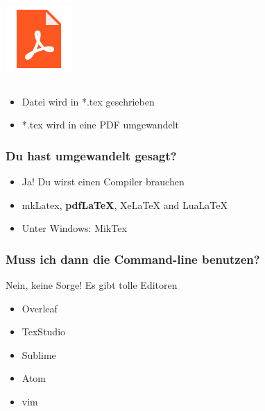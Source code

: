 \documentclass{beamer}
\begin{document}
\begin{frame}
\begin{columns}[c]
     \includegraphics[width=\textwidth]{pictures/pdficon.png}
          
     \end{columns}
\begin{itemize}[<+->]
     \item Datei wird in *.tex geschrieben
     \item *.tex wird in eine PDF umgewandelt
\end{itemize}
\end{frame}

\begin{frame}
     \frametitle{Du hast umgewandelt gesagt?}
     \begin{itemize}[<+->]
          \item Ja! Du wirst einen Compiler brauchen
               \item mkLatex, \textbf{pdfLaTeX}, XeLaTeX and LuaLaTeX
               \item Unter Windows: MikTex
     \end{itemize}
\end{frame}




\begin{frame}
     \frametitle{Muss ich dann die Command-line benutzen?}
     Nein, keine Sorge! Es gibt tolle Editoren
     \begin{itemize}[<+->]
          \item Overleaf
          \item TexStudio
          \item Sublime 
          \item Atom
          \item vim
     \end{itemize}
\end{frame}
\end{document}
